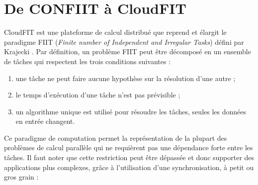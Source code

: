

\section{De CONFIIT à CloudFIT}

CloudFIT est une plateforme de calcul distribué que reprend et élargit le paradigme FIIT (\textit{Finite number of Independent and Irregular Tasks}) défini par Krajecki \cite{Kraj99}. Par définition, un problème FIIT peut être décomposé en un ensemble de tâches qui respectent les trois conditions suivantes :
\begin{enumerate}
	\item une tâche ne peut faire aucune hypothèse sur la résolution d'une autre ;
	\item le temps d'exécution d'une tâche n'est pas prévisible ;
	\item un algorithme unique est utilisé pour résoudre les tâches, seules les données en entrée changent. 
\end{enumerate}

Ce paradigme de computation permet la représentation de la plupart des problèmes de calcul parallèle qui ne requièrent pas une dépendance forte entre les tâches. Il faut noter que cette restriction peut être dépassée et donc supporter des applications plus complexes, grâce à l'utilisation d'une synchronisation, à petit ou gros grain :

